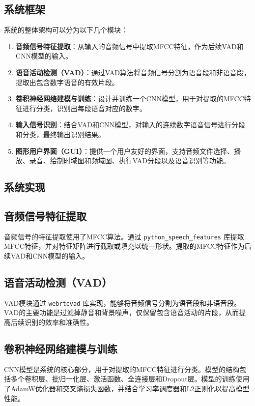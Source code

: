 \documentclass[12pt,hyperref,a4paper,UTF8]{ctexart}
\begin{document}
\subsection{系统框架}

系统的整体架构可以分为以下几个模块：
\begin{enumerate}
    \item \textbf{音频信号特征提取}：从输入的音频信号中提取MFCC特征，作为后续VAD和CNN模型的输入。
    \item \textbf{语音活动检测（VAD）}：通过VAD算法将音频信号分割为语音段和非语音段，提取出包含数字语音的有效片段。
    \item \textbf{卷积神经网络建模与训练}：设计并训练一个CNN模型，用于对提取的MFCC特征进行分类，识别出每段语音对应的数字。
    \item \textbf{输入信号识别}：结合VAD和CNN模型，对输入的连续数字语音信号进行分段和分类，最终输出识别结果。
    \item \textbf{图形用户界面（GUI）}：提供一个用户友好的界面，支持音频文件选择、播放、录音、绘制时域图和频域图、执行VAD分段以及语音识别等功能。
\end{enumerate}

\subsection{系统实现}

\subsection*{音频信号特征提取}

音频信号的特征提取使用了MFCC算法。通过 \texttt{python\_speech\_features} 库提取MFCC特征，并对特征矩阵进行截取或填充以统一形状。提取的MFCC特征作为后续VAD和CNN模型的输入。

\subsection*{语音活动检测（VAD）}

VAD模块通过 \texttt{webrtcvad} 库实现，能够将音频信号分割为语音段和非语音段。VAD的主要功能是过滤掉静音和背景噪声，仅保留包含语音活动的片段，从而提高后续识别的效率和准确性。

\subsection*{卷积神经网络建模与训练}

CNN模型是系统的核心部分，用于对提取的MFCC特征进行分类。模型的结构包括多个卷积层、批归一化层、激活函数、全连接层和Dropout层。模型的训练使用了AdamW优化器和交叉熵损失函数，并结合学习率调度器和L2正则化以提高模型性能。
\end{document}
